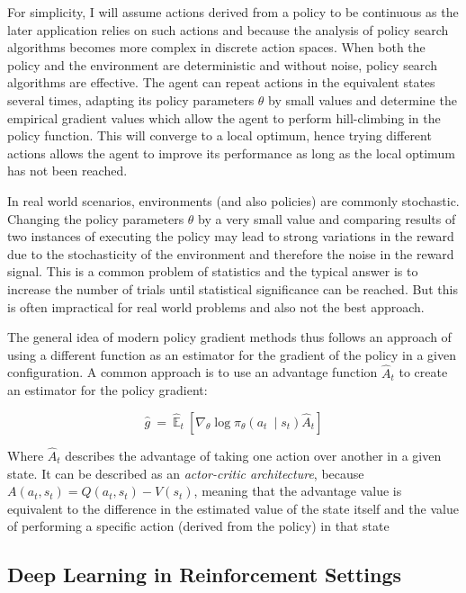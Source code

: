For simplicity, I will assume actions derived from a policy to be continuous as the later application relies on
such actions and because the analysis of policy search algorithms becomes more complex in discrete action spaces. When
both the policy and the environment are deterministic and without noise, policy search algorithms are effective.
The agent can repeat actions in the equivalent states several times, adapting its policy parameters $\theta$ by small
values and determine the empirical gradient values which allow the agent to perform hill-climbing in the policy
function. This will converge to a local optimum, hence trying different actions allows the agent to improve its
performance as long as the local optimum has not been reached.

In real world scenarios, environments (and also policies) are commonly stochastic. Changing the policy
parameters $\theta$ by a very small value and comparing results of two instances of executing the policy may lead to
strong variations in the reward due to the stochasticity of the environment and therefore the noise in the reward
signal. This is a common problem of statistics and the typical answer is to increase the number of trials until
statistical significance can be reached. But this is often impractical for real world problems and also not the best
approach.

The general idea of modern policy gradient methods thus follows an approach of using a different function as an
estimator for the gradient of the policy in a given configuration. A common approach is to use an advantage function
$\hat{A}_t$ to create an estimator for the policy gradient:


\begin{equation}
    \hat{g} \ =\ \hat{\mathbb{E}}_{t} \ \left[ \nabla _{\theta }\log \pi _{\theta }( a_{t} \ \mid s_{t})\hat{A}_{t}  \right]
\end{equation}

Where $\hat{A}_t$ describes the advantage of taking one action over another in a given state. It can be
described as an \emph{actor-critic architecture}, because $A(a_t, s_t) = Q(a_t,s_t) - V(s_t)$, meaning that the
advantage value is equivalent to the difference in the estimated value of the state itself and the value of performing
a specific action (derived from the policy) in that state \citep{mnih2016asynchronous}

\subsection{Deep Learning in Reinforcement Settings}%
\label{sub:deep_learning_in_reinforcement_settings}

